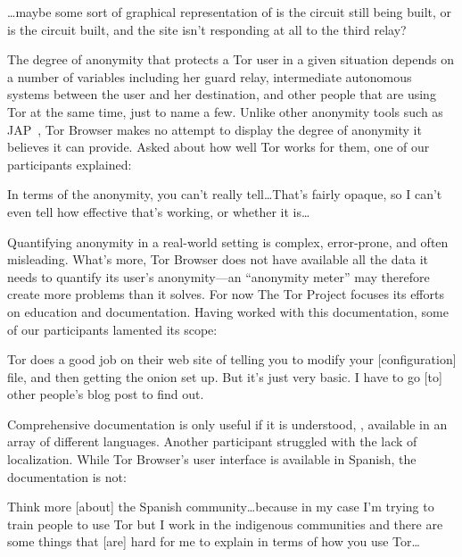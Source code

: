 \begin{displayquote}
\dots maybe some sort of graphical representation of is the circuit still
being built, or is the circuit built, and the site isn't responding at all to
the third relay?
\end{displayquote}

The degree of anonymity that protects a Tor user in a given situation depends on
a number of variables including her guard relay, intermediate autonomous systems
between the user and her destination, and other people that are using Tor at the
same time, just to name a few.  Unlike other anonymity tools such as
JAP~\cite{jap}, Tor Browser makes no attempt to display the degree of anonymity
it believes it can provide.  Asked about how well Tor works for them, one
of our participants explained:

\begin{displayquote}
In terms of the anonymity, you can't really tell\dots That's fairly opaque, so I
can't even tell how effective that's working, or whether it is\dots
\end{displayquote}

Quantifying anonymity in a real-world setting is complex, error-prone, and often
misleading.  What's more, Tor Browser does not have available all the data it
needs to quantify its user's anonymity---an ``anonymity meter'' may therefore
create more problems than it solves.  For now The Tor Project focuses its
efforts on education and documentation.  Having worked with this documentation,
some of our participants lamented its scope:

\begin{displayquote}
Tor does a good job on their web site of telling you to modify your
[configuration] file, and then getting the onion set up.  But it's just very
basic.  I have to go [to] other people's blog post to find out.
\end{displayquote}

Comprehensive documentation is only useful if it is understood, \ie, available
in an array of different languages.  Another participant struggled with the lack
of localization.  While Tor Browser's user interface is available in Spanish,
the documentation is not:

\begin{displayquote}
Think more [about] the Spanish community\dots because in my case I'm trying to
train people to use Tor but I work in the indigenous communities and there are
some things that [are] hard for me to explain in terms of how you use Tor\dots
\end{displayquote}

